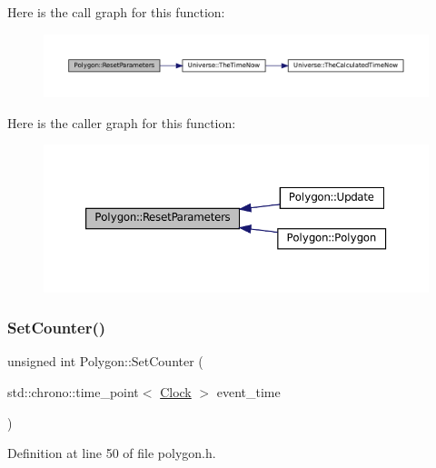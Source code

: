 Here is the call graph for this function\+:\nopagebreak
\begin{figure}[H]
\begin{center}
\leavevmode
\includegraphics[width=350pt]{class_polygon_a0e2824d12cd6b18c8b14c64ef4b2bf97_cgraph}
\end{center}
\end{figure}
Here is the caller graph for this function\+:\nopagebreak
\begin{figure}[H]
\begin{center}
\leavevmode
\includegraphics[width=350pt]{class_polygon_a0e2824d12cd6b18c8b14c64ef4b2bf97_icgraph}
\end{center}
\end{figure}
\mbox{\label{class_polygon_a344626b07ee8dc40c71c3bec1480d2c2}} 
\subsubsection{\texorpdfstring{Set\+Counter()}{SetCounter()}\hspace{0.1cm}{\footnotesize\ttfamily [1/2]}}
{\footnotesize\ttfamily unsigned int Polygon\+::\+Set\+Counter (\begin{DoxyParamCaption}\item[{std\+::chrono\+::time\+\_\+point$<$ \mbox{\hyperlink{universe_8h_a0ef8d951d1ca5ab3cfaf7ab4c7a6fd80}{Clock}} $>$}]{event\+\_\+time }\end{DoxyParamCaption})\hspace{0.3cm}{\ttfamily [inline]}}



Definition at line 50 of file polygon.\+h.

